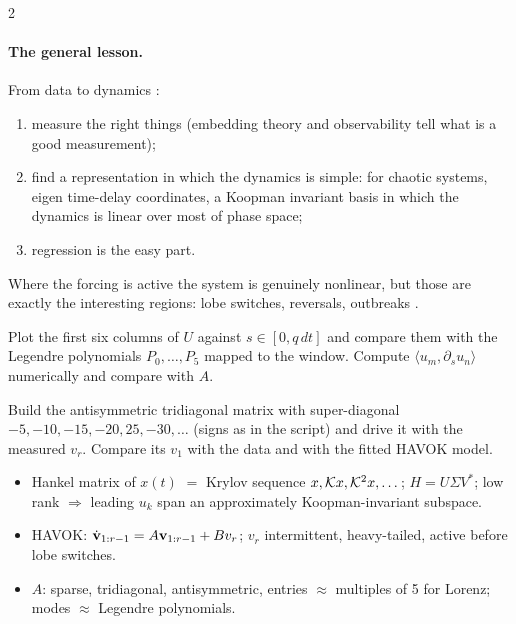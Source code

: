 \begin{paracol}{2}
\paragraph{The general lesson.} From data to dynamics :
\begin{enumerate}
  \item measure the right things (embedding theory and observability tell what is a good measurement);
  \item find a representation in which the dynamics is simple: for chaotic systems, eigen time-delay coordinates, a Koopman
        invariant basis in which the dynamics is linear over most of phase space;
  \item regression is the easy part.
\end{enumerate}
Where the forcing is active the system is genuinely nonlinear, but those are exactly the interesting regions: lobe switches,
reversals, outbreaks .

\begin{exercise}
Plot the first six columns of $U$ against $s\in[0,q\,dt]$ and compare them with the Legendre polynomials $P_0,\dots,P_5$ mapped to the
window. Compute $\langle u_m,\partial_su_n\rangle$ numerically and compare with $A$.
\end{exercise}

\begin{exercise}
Build the antisymmetric tridiagonal matrix with super-diagonal $-5,-10,-15,-20,25,-30,\dots$ (signs as in the script) and drive it with
the measured $v_r$. Compare its $v_1$ with the data and with the fitted HAVOK model.
\end{exercise}

\begin{keyformulas}
\begin{itemize}
  \item Hankel matrix of $x(t)$ $=$ Krylov sequence $x,\mathcal{K} x,\mathcal{K}^2x,\dots$; $H=U\Sigma V^*$; low rank $\Rightarrow$ leading $u_k$ span an
        approximately Koopman-invariant subspace.
  \item HAVOK: $\dot{\mathbf{v}}_{1:r-1}=A\mathbf{v}_{1:r-1}+Bv_r$; $v_r$ intermittent, heavy-tailed, active before lobe switches.
  \item $A$: sparse, tridiagonal, antisymmetric, entries $\approx$ multiples of 5 for Lorenz; modes $\approx$ Legendre polynomials.
\end{itemize}
\end{keyformulas}

\end{paracol}
